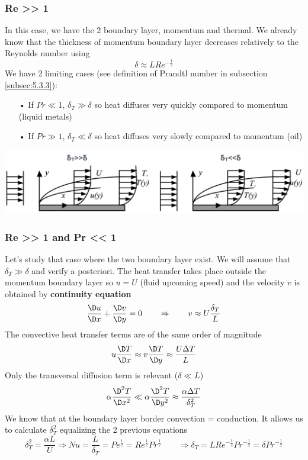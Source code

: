 	\subsubsection{Re >> 1}
		In this case, we have the 2 boundary layer, momentum and thermal. We already know that the thickness of momentum boundary layer decreases relatively to the Reynolds number using
		 \begin{equation}
		 	\delta \approx LRe^{-\frac{1}{2}}
		 \end{equation}
		 We have 2 limiting cases (see definition of Prandtl number in subsection \ref{subsec:5.3.3}): 
		 \begin{itemize}
		 	\item[•] If $Pr \ll 1$, $\delta _T \gg \delta$ so heat diffuses very quickly compared to momentum (liquid metals)
		 	\item[•] If $Pr \gg 1$, $\delta _T \ll \delta$ so heat diffuses very slowly compared to momentum (oil)
		 \end{itemize}
		 \begin{center}
		 \includegraphics[scale=0.3]{ch5/8}
		 \end{center}
		 
	\subsubsection{Re >> 1 and Pr << 1}
		Let's study that case where the two boundary layer exist. We will assume that $\delta _T \gg \delta$ and verify a posteriori. The heat transfer takes place outside the momentum boundary layer so $u=U$ (fluid upcoming speed) and the velocity $v$ is obtained by \textbf{continuity equation}
		\begin{equation}
			\frac{\D u}{\D x} + \frac{\D v}{\D y} = 0 \qquad \Rightarrow \qquad v \approx U\frac{\delta _T}{L}
		\end{equation}
		The convective heat transfer terms are of the same order of magnitude 
		\begin{equation}
			u\frac{\D T}{\D x} \approx v\frac{\D T}{\D y} \approx \frac{U\Delta T}{L}
		\end{equation}
		Only the transversal diffusion term is relevant ($\delta \ll L$)
		\begin{equation}
			\alpha \frac{\D ^2 T}{\D x^2} \ll \alpha \frac{\D ^2 T}{\D y^2} \approx \frac{\alpha \Delta T}{\delta _T ^2}
		\end{equation}
		We know that at the boundary layer border convection = conduction. It allows us to calculate $\delta _T^2$ equalizing the 2 previous equations
		\begin{equation}
			\delta _T^2 = \frac{\alpha L}{U} \Rightarrow Nu = \frac{L}{\delta _T} = Pe ^{\frac{1}{2}} = Re^{\frac{1}{2}} Pr^{\frac{1}{2}} \qquad \Rightarrow  \delta _T = LRe^{-\frac{1}{2}}Pr^{-\frac{1}{2}} = \delta Pr^{-\frac{1}{2}}
		\end{equation}
		
